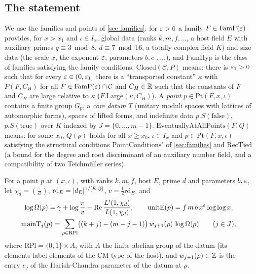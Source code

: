 \subsection{The statement}\label{sec:covolume:statement}

We use the families and points of \cref{sec:families}: for $\varepsilon>0$ a family $F\in\mathrm{FamP}(\varepsilon)$
provides, for $x>x_1$ and $\iota\in I_x$, global data (ranks $k,m,f,\dots$, a host field $E$ with
auxiliary primes $q\equiv3\bmod8$, $d\equiv7\bmod16$, a totally complex field $K$) and size data (the
scale $x$, the exponent $\varepsilon$, parameters $b,e_z,\dots$), and $\mathrm{FamHyp}$ is the class of families
satisfying the family conditions. $\mathrm{Closed}(\mathcal C,P)$ means: there is $\varepsilon_1>0$ such that for
every $\varepsilon\in(0,\varepsilon_1]$ there is a ``transported constant'' $\kappa$ with $P(F,C_H)$ for all
$F\in\mathrm{FamP}(\varepsilon)\cap\mathcal C$ and $C_H\in\mathbb{R}$ such that the constants of $F$ and $C_H$ are large
relative to $\kappa$ ($F.\mathrm{Large}(\kappa,C_H)$). A \emph{point} $p\in\mathrm{Pt}(F,x,\iota)$ contains a
finite group $G_p$, a \emph{core datum} $T$ (unitary moduli spaces with lattices of automorphic forms),
spaces of lifted forms, and indefinite data $p.S(\mathrm{false})$, $p.S(\mathrm{true})$ over $K$ indexed by
$J=\{0,\dots,m-1\}$. $\mathrm{EventuallyAtAllPoints}(F,Q)$ means: for some $x_0$, $Q(p)$ holds for all
$x\ge x_0$, $\iota\in I_x$ and $p\in\mathrm{Pt}(F,x,\iota)$ satisfying the structural conditions
$\mathrm{PointConditions}'$ of \cref{sec:families} and $\mathrm{RecTied}$ (a bound for the degree and root
discriminant of an auxiliary number field, and a compatibility of two Teichm\"uller series).

\begin{definition}\label{def:covolume:mainT}
For a point $p$ at $(x,\iota)$, with ranks $k,m,f$, host $E$, prime $d$ and parameters $b,\varepsilon$, let
$\chi_d=(\frac{\cdot}{d})$, $\mathrm{rd}_E=|d_E|^{1/[E:\mathbb{Q}]}$, $v=\frac12\mathrm{rd}_E$, and
\begin{gather*}
\log\Omega(p)=\gamma+\log\frac{\pi}{v}-\operatorname{Re}\frac{L'(1,\chi_d)}{L(1,\chi_d)},\qquad
\mathrm{unitE}(p)=f\,m\,b\,x^{\varepsilon}\log\log x,\\
\mathrm{mainT}_j(p)=\sum_{\rho\in\mathrm{RPl}}\bigl((k+j)-(m-j-1)\bigr)\,w_{j+1}(\rho)\,\log\Omega(p)
\qquad(j\in J),
\end{gather*}
where $\mathrm{RPl}=\{0,1\}\times A$, with $A$ the finite abelian group of the datum (its elements label
elements of the CM type of the host), and $w_{j+1}(\rho)\in\mathbb{Z}$ is the entry $e_j$ of the
Harish-Chandra parameter of the datum at $\rho$.
\end{definition}

